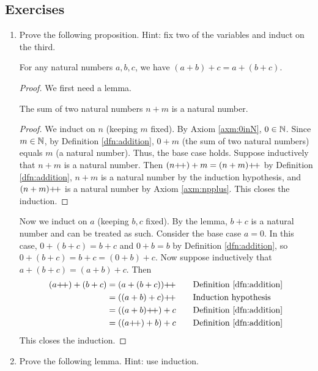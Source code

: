\documentclass[../main.tex]{subfiles}
\begin{document}
\subsection*{Exercises}
\begin{enumerate}[ref={\thesection.\arabic*}]
    \item \label{exr:2.2.1}Prove the following proposition. Hint: fix two of the variables and induct on the third.
    \begin{prop}\label{prp:associativity}
        For any natural numbers $a,b,c$, we have $(a+b)+c=a+(b+c)$.
        \begin{proof}
            We first need a lemma.
            \begin{lem}\label{lem:sumNaturalsIsNatural}
                The sum of two natural numbers $n+m$ is a natural number.
                \begin{proof}
                    We induct on $n$ (keeping $m$ fixed). By Axiom \ref{axm:0inN}, $0\in\mathbb{N}$. Since $m\in\mathbb{N}$, by Definition \ref{dfn:addition}, $0+m$ (the sum of two natural numbers) equals $m$ (a natural number). Thus, the base case holds. Suppose inductively that $n+m$ is a natural number. Then $(n{+\!+})+m=(n+m){+\!+}$ by Definition \ref{dfn:addition}, $n+m$ is a natural number by the induction hypothesis, and $(n+m){+\!+}$ is a natural number by Axiom \ref{axm:npplus}. This closes the induction.
                \end{proof}
            \end{lem}
            Now we induct on $a$ (keeping $b,c$ fixed). By the lemma, $b+c$ is a natural number and can be treated as such. Consider the base case $a=0$. In this case, $0+(b+c)=b+c$ and $0+b=b$ by Definition \ref{dfn:addition}, so $0+(b+c)=b+c=(0+b)+c$. Now suppose inductively that $a+(b+c)=(a+b)+c$. Then
            \begin{align*}
                (a\pplus)+(b+c) &= (a+(b+c))\pplus\tag*{Definition \ref{dfn:addition}}\\
                &= ((a+b)+c)\pplus\tag*{Induction hypothesis}\\
                &= ((a+b)\pplus)+c\tag*{Definition \ref{dfn:addition}}\\
                &= ((a\pplus)+b)+c\tag*{Definition \ref{dfn:addition}}
            \end{align*}
            This closes the induction.
        \end{proof}
    \end{prop}
    \item \label{exr:2.2.2}Prove the following lemma. Hint: use induction.

\end{enumerate}
\end{document}
